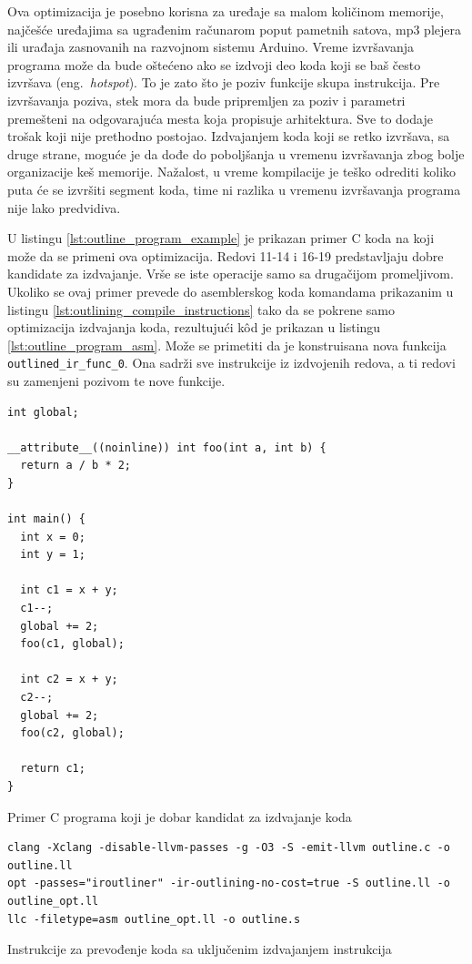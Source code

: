 \documentclass[12pt,oneside]{memoir}
\begin{document}
Ova optimizacija je posebno korisna za uređaje sa malom količinom memorije, najčešće uređajima sa ugrađenim računarom poput pametnih satova, mp3 plejera ili urađaja zasnovanih na razvojnom sistemu Arduino.
Vreme izvršavanja programa može da bude oštećeno ako se izdvoji deo koda koji se baš često izvršava (eng.~{\em hotspot}).
To je zato što je poziv funkcije skupa instrukcija.
Pre izvršavanja poziva, stek mora da bude pripremljen za poziv i parametri premešteni na odgovarajuća mesta koja propisuje arhitektura.
Sve to dodaje trošak koji nije prethodno postojao.
Izdvajanjem koda koji se retko izvršava, sa druge strane, moguće je da dođe do poboljšanja u vremenu izvršavanja zbog bolje organizacije keš memorije.
Nažalost, u vreme kompilacije je teško odrediti koliko puta će se izvršiti segment koda, time ni razlika u vremenu izvršavanja programa nije lako predvidiva.

U listingu \ref{lst:outline_program_example} je prikazan primer C koda na koji može da se primeni ova optimizacija.
Redovi 11-14 i 16-19 predstavljaju dobre kandidate za izdvajanje. Vrše se iste operacije samo sa drugačijom promeljivom.
Ukoliko se ovaj primer prevede do asemblerskog koda komandama prikazanim u listingu \ref{lst:outlining_compile_instructions} tako da se pokrene samo optimizacija izdvajanja koda, rezultujući k\^od je prikazan u listingu \ref{lst:outline_program_asm}.
Može se primetiti da je konstruisana nova funkcija \verb|outlined_ir_func_0|. Ona sadrži sve instrukcije iz izdvojenih redova, a ti redovi su zamenjeni pozivom te nove funkcije.

\begin{listing}[!ht]
\begin{verbatim}
int global;

__attribute__((noinline)) int foo(int a, int b) {
  return a / b * 2;
}

int main() {
  int x = 0;
  int y = 1;
  
  int c1 = x + y;
  c1--;
  global += 2;
  foo(c1, global);
  
  int c2 = x + y;
  c2--;
  global += 2;
  foo(c2, global);
  
  return c1;
}
\end{verbatim}
\caption{Primer C programa koji je dobar kandidat za izdvajanje koda}
\label{lst:outline_program_example}
\end{listing}

\begin{listing}[!ht]
  \begin{verbatim}
clang -Xclang -disable-llvm-passes -g -O3 -S -emit-llvm outline.c -o outline.ll
opt -passes="iroutliner" -ir-outlining-no-cost=true -S outline.ll -o outline_opt.ll
llc -filetype=asm outline_opt.ll -o outline.s
  \end{verbatim}
  \caption{Instrukcije za prevođenje koda sa uključenim izdvajanjem instrukcija}
  \label{lst:outlining_compile_instructions}
\end{listing}
\end{document}
